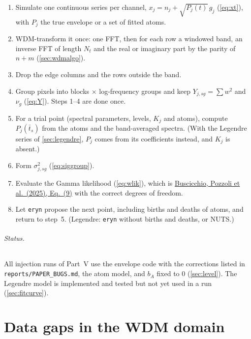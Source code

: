 \documentclass[11pt,a4paper]{article}
\newcommand{\urlPone}{https://arxiv.org/pdf/2511.03604}
\newcommand{\PoneEq}[1]{\href{\urlPone}{Buscicchio, Pozzoli et al.~(2025), Eq.~(#1)}}
\begin{document}
\begin{keybox}
\begin{enumerate}
  \item Simulate one continuous series per channel, $x_j=n_j+\sqrt{P_j(t)}\,g_j$
        (\cref{eq:xt}), with $P_j$ the true envelope or a set of fitted atoms.
  \item WDM-transform it once: one FFT, then for each row a windowed band, an inverse
        FFT of length $N_t$ and the real or imaginary part by the parity of $n+m$
        (\cref{sec:wdmalgo}).
  \item Drop the edge columns and the rows outside the band.
  \item Group pixels into blocks $\times$ log-frequency groups and keep
        $Y_{j,sg}=\sum w^2$ and $\nu_g$ (\cref{eq:Y}). Steps 1--4 are done once.
  \item For a trial point (spectral parameters, levels, $K_j$ and atoms), compute
        $P_j(\bar t_s)$ from the atoms and the band-averaged spectra. (With the
        Legendre series of \cref{sec:legendre}, $P_j$ comes from its coefficients
        instead, and $K_j$ is absent.)
  \item Form $\sigma^2_{j,sg}$ (\cref{eq:siggroup}).
  \item Evaluate the Gamma likelihood (\cref{eq:wlik}), which is \PoneEq{9} with the
        correct degrees of freedom.
  \item Let \texttt{eryn} propose the next point, including births and deaths of
        atoms, and return to step~5. (Legendre: \texttt{eryn} without births and
        deaths, or NUTS.)
\end{enumerate}
\end{keybox}

\paragraph{Status.} All injection runs of Part~V use the envelope code with the
corrections listed in \texttt{reports/PAPER\_BUGS.md}, the atom model, and $b_A$
fixed to 0 (\cref{sec:level}). The Legendre model is implemented and tested but not
yet used in a run (\cref{sec:fitcurve}).

\clearpage
\part{Data gaps in the WDM domain}
\end{document}
